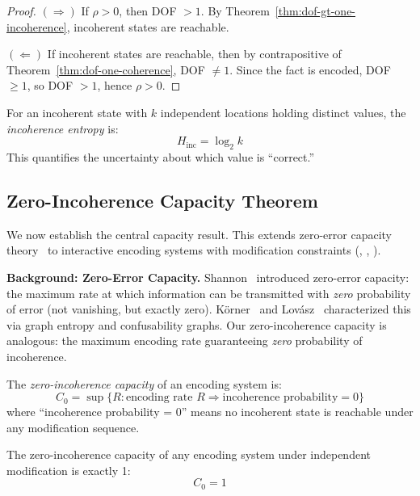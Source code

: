 \begin{proof}
$(\Rightarrow)$ If $\rho > 0$, then DOF $> 1$. By Theorem~\ref{thm:dof-gt-one-incoherence}, incoherent states are reachable.

$(\Leftarrow)$ If incoherent states are reachable, then by contrapositive of Theorem~\ref{thm:dof-one-coherence}, DOF $\neq 1$. Since the fact is encoded, DOF $\geq 1$, so DOF $> 1$, hence $\rho > 0$.
\end{proof}

\begin{definition}\label{def:incoherence-entropy}
For an incoherent state with $k$ independent locations holding distinct values, the \emph{incoherence entropy} is:
\[
H_{\text{inc}} = \log_2 k
\]
This quantifies the uncertainty about which value is ``correct.''
\end{definition}

\subsection{Zero-Incoherence Capacity Theorem}\label{sec:capacity}

We now establish the central capacity result. This extends zero-error capacity theory~\cite{korner1973graphs,lovasz1979shannon} to interactive encoding systems with modification constraints (, , ).

\textbf{Background: Zero-Error Capacity.} Shannon~\cite{shannon1956zero} introduced zero-error capacity: the maximum rate at which information can be transmitted with \emph{zero} probability of error (not vanishing, but exactly zero). Körner~\cite{korner1973graphs} and Lovász~\cite{lovasz1979shannon} characterized this via graph entropy and confusability graphs. Our zero-incoherence capacity is analogous: the maximum encoding rate guaranteeing \emph{zero} probability of incoherence.

\begin{definition}\label{def:coherence-capacity}
The \emph{zero-incoherence capacity} of an encoding system is:
\[
C_0 = \sup\{R : \text{encoding rate } R \Rightarrow \text{incoherence probability} = 0\}
\]
where ``incoherence probability = 0'' means no incoherent state is reachable under any modification sequence.
\end{definition}

\begin{theorem}\label{thm:coherence-capacity}
The zero-incoherence capacity of any encoding system under independent modification is exactly 1:
\[
C_0 = 1
\]
\end{theorem}

